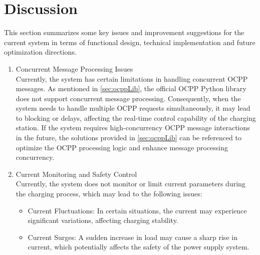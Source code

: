 \documentclass[
english,
ruledheaders=section,%
class=report,%
thesis={type=Report},%
accentcolor=9c,%
custommargins=true,%
marginpar=false,%
parskip=half-,%
fontsize=11pt,%
logofile={img/tuda_logo.pdf}, %
]{tudapub}
\begin{document}
        \section{Discussion}
        This section summarizes some key issues and improvement suggestions for the current system in terms of functional design, technical implementation and future optimization directions.
        \begin{enumerate}

            \item Concurrent Message Processing Issues\\
            Currently, the system has certain limitations in handling concurrent OCPP messages. As mentioned in \ref{sec:ocppLib}, the official OCPP Python library does not  support concurrent message processing. Consequently, when the system needs to handle multiple OCPP requests simultaneously, it may lead to blocking or delays, affecting the real-time control capability of the charging station. If the system requires high-concurrency OCPP message interactions in the future, the solutions provided in \ref{sec:ocppLib} can be referenced to optimize the OCPP processing logic and enhance message processing concurrency.


            \item Current Monitoring and Safety Control\\
            Currently, the system does not monitor or limit current parameters during the charging process, which may lead to the following issues:
            \begin{itemize}
                \item Current Fluctuations: In certain situations, the current may experience significant variations, affecting charging stability.
                \item Current Surges: A sudden increase in load may cause a sharp rise in current, which potentially affects the safety of the power supply system.
            \end{itemize}


\end{enumerate}
\end{document}
